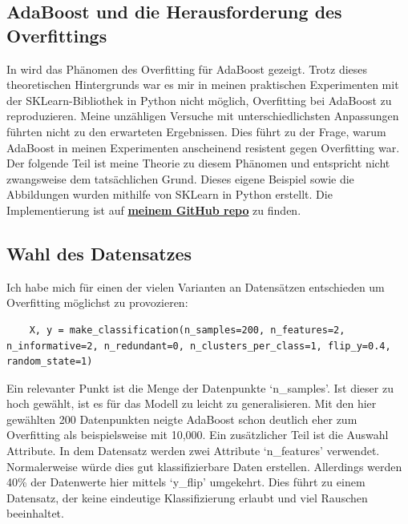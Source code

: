 \subsection{AdaBoost und die Herausforderung des Overfittings}
In \textcite[Kapitel 1.2.3]{SchapireFreund2012} wird das Phänomen des Overfitting für AdaBoost gezeigt. Trotz dieses theoretischen Hintergrunds war es mir in meinen praktischen Experimenten mit der SKLearn-Bibliothek in Python nicht möglich, Overfitting bei AdaBoost zu reproduzieren. Meine unzähligen Versuche mit unterschiedlichsten Anpassungen führten nicht zu den erwarteten Ergebnissen. Dies führt zu der Frage, warum AdaBoost in meinen Experimenten anscheinend resistent gegen Overfitting war. Der folgende Teil ist meine Theorie zu diesem Phänomen und entspricht nicht zwangsweise dem tatsächlichen Grund. Dieses eigene Beispiel sowie die Abbildungen wurden mithilfe von SKLearn in Python erstellt. Die Implementierung ist auf \textbf{\href{https://github.com/CodeLtDave/Boosting-Algorithms-ML-Seminararbeit/blob/main/python-env/ToleranceOverfittingAdaBoost.ipynb}{meinem GitHub repo}} zu finden.

\subsection{Wahl des Datensatzes}

Ich habe mich für einen der vielen Varianten an Datensätzen entschieden um Overfitting möglichst zu provozieren:

\begin{lstlisting}
    X, y = make_classification(n_samples=200, n_features=2, n_informative=2, n_redundant=0, n_clusters_per_class=1, flip_y=0.4, random_state=1)
\end{lstlisting}    
Ein relevanter Punkt ist die Menge der Datenpunkte `n\_samples'. Ist dieser zu hoch 
gewählt, ist es für das Modell zu leicht zu generalisieren. Mit den hier gewählten 200 Datenpunkten neigte AdaBoost schon deutlich eher zum Overfitting als beispielsweise mit 10,000.
\newline
Ein zusätzlicher Teil ist die Auswahl Attribute. In dem Datensatz werden zwei Attribute `n\_features' verwendet. Normalerweise würde dies gut klassifizierbare Daten erstellen. Allerdings werden 40\% der Datenwerte hier mittels `y\_flip' umgekehrt. Dies führt zu einem Datensatz, der keine eindeutige Klassifizierung erlaubt und viel Rauschen beeinhaltet.

